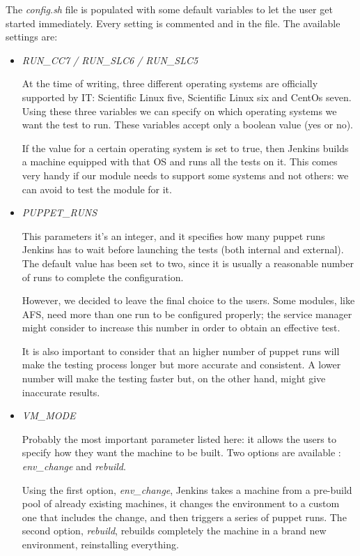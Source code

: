 The \textit{config.sh} file is populated with some default variables to
let the user get started immediately. Every setting is commented and in
the file. The available settings are:

\begin{itemize}

  \item \textit{RUN\_CC7 / RUN\_SLC6 / RUN\_SLC5}

At the time of writing, three different operating systems are officially
supported by IT: Scientific Linux five, Scientific Linux six and CentOs
seven. Using these three variables we can specify on which operating
systems we want the test to run. These variables accept only a boolean
value (yes or no).

If the value for a certain operating system is set to true, then Jenkins
builds a machine equipped with that OS and runs all the tests on it. This
comes very handy if our module needs to support some systems and not
others: we can avoid to test the module for it.

  \item \textit{PUPPET\_RUNS}

This parameters it's an integer, and it specifies how many puppet runs
Jenkins has to wait before launching the tests (both internal and
external). The default value has been set to two, since it is usually
a reasonable number of runs to complete the configuration.

However, we decided to leave the final choice to the users. Some modules,
like AFS, need more than one run to be configured properly; the service
manager might consider to increase this number in order to obtain an
effective test.

It is also important to consider that an higher number of puppet runs will
make the testing process longer but more accurate and consistent. A lower
number will make the testing faster but, on the other hand, might give
inaccurate results.

  \item \textit{VM\_MODE}

Probably the most important parameter listed here: it allows the users to
specify how they want the machine to be built. Two options are available
: \textit{env\_change} and \textit{rebuild}.

Using the first option, \textit{env\_change}, Jenkins takes a machine from
a pre-build pool of already existing machines, it changes the environment
to a custom one that includes the change, and then triggers a series of
puppet runs. The second option, \textit{rebuild}, rebuilds completely the
machine in a brand new environment, reinstalling everything.


\end{itemize}
